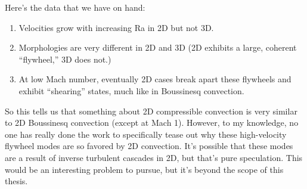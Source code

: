 \documentclass[aps, pre, onecolumn, nofootinbib, notitlepage, groupedaddress, amsfonts, amssymb, amsmath, longbibliography, superscriptaddress]{revtex4-1}
\begin{document}
Here's the data that we have on hand:
\begin{enumerate}
\item Velocities grow with increasing Ra in 2D but not 3D.
\item Morphologies are very different in 2D and 3D (2D exhibits a large, coherent ``flywheel,'' 3D does not.)
\item At low Mach number, eventually 2D cases break apart these flywheels and exhibit ``shearing'' states, much like in Boussinesq convection.
\end{enumerate}
So this tells us that something about 2D compressible convection is very similar to 2D Boussinesq convection (except at Mach 1).
However, to my knowledge, no one has really done the work to specifically tease out why these high-velocity flywheel modes are so favored by 2D convection.
It's possible that these modes are a result of inverse turbulent cascades in 2D, but that's pure speculation.
This would be an interesting problem to pursue, but it's beyond the scope of this thesis.
\end{document}
